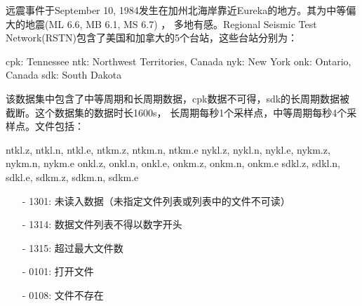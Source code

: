 远震事件于September 10, 1984发生在加州北海岸靠近Eureka的地方。其为中等偏大的地震(ML 6.6, MB 6.1, MS 6.7) ，
多地有感。Regional Seismic Test Network(RSTN)包含了美国和加拿大的5个台站，这些台站分别为：
\begin{SACCode} 
    cpk: Tennessee
    ntk: Northwest Territories, Canada
    nyk: New York
    onk: Ontario, Canada
    sdk: South Dakota
\end{SACCode}
该数据集中包含了中等周期和长周期数据，cpk数据不可得，sdk的长周期数据被截断。这个数据集的数据时长1600s，
长周期每秒1个采样点，中等周期每秒4个采样点。文件包括：
\begin{SACCode} 
    ntkl.z, ntkl.n, ntkl.e, ntkm.z, ntkm.n, ntkm.e
    nykl.z, nykl.n, nykl.e, nykm.z, nykm.n, nykm.e
    onkl.z, onkl.n, onkl.e, onkm.z, onkm.n, onkm.e
    sdkl.z, sdkl.n, sdkl.e, sdkm.z, sdkm.n, sdkm.e
\end{SACCode}

\begin{itemize}
\item[-]1301: 未读入数据（未指定文件列表或列表中的文件不可读）
\item[-]1314: 数据文件列表不得以数字开头
\item[-]1315: 超过最大文件数
\end{itemize}

\begin{itemize}
\item[-]0101: 打开文件
\item[-]0108: 文件不存在
\end{itemize}
